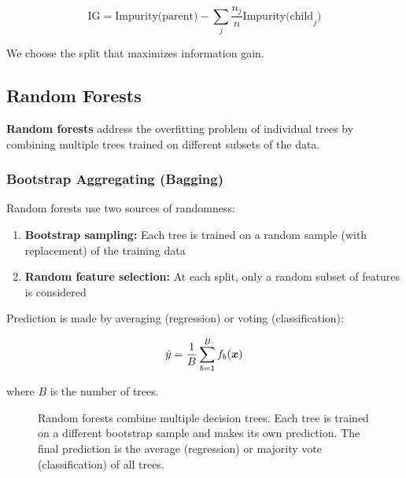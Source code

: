 \begin{equation}
\text{IG} = \text{Impurity(parent)} - \sum_{j} \frac{n_j}{n} \text{Impurity(child}_j\text{)}
\end{equation}

We choose the split that maximizes information gain.

\subsection{Random Forests}

\textbf{Random forests} address the overfitting problem of individual trees by combining multiple trees trained on different subsets of the data.

\subsubsection{Bootstrap Aggregating (Bagging)}

Random forests use two sources of randomness:

\begin{enumerate}
    \item \textbf{Bootstrap sampling:} Each tree is trained on a random sample (with replacement) of the training data
    \item \textbf{Random feature selection:} At each split, only a random subset of features is considered
\end{enumerate}

Prediction is made by averaging (regression) or voting (classification):

\begin{equation}
\hat{y} = \frac{1}{B} \sum_{b=1}^{B} f_b(\boldsymbol{x})
\end{equation}

where $B$ is the number of trees.

\begin{figure}[htbp]
\centering
{}
\caption{Random forests combine multiple decision trees. Each tree is trained on a different bootstrap sample and makes its own prediction. The final prediction is the average (regression) or majority vote (classification) of all trees.}
\label{fig:random-forest}
\end{figure}

